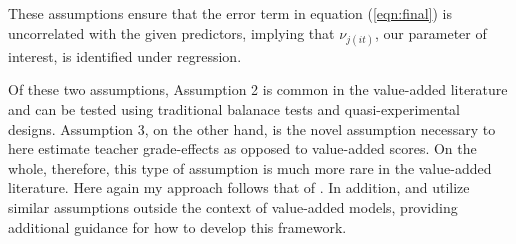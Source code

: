 \documentclass[../thesis_main.tex]{subfiles}
\begin{document}
\bigskip
\noindent{}
\bigskip

\bigskip
\noindent{}
\bigskip

\noindent These assumptions ensure that the error term in equation (\ref{eqn:final}) is uncorrelated with the given predictors, implying that $\nu_{j(it)}$, our parameter of interest, is identified under regression.

Of these two assumptions, Assumption 2 is common in the value-added literature and can be tested using traditional balanace tests and quasi-experimental designs. Assumption 3, on the other hand, is the novel assumption necessary to here estimate teacher grade-effects as opposed to value-added scores. On the whole, therefore, this type of assumption is much more rare in the value-added literature. Here again my approach follows that of \citet{gilraineMakingTeachingLast2020}. In addition, \citet{abdulkadirogluChartersLotteriesTesting2016} and \citet{kolesarIdentificationInferenceMany2015} utilize similar assumptions outside the context of value-added models, providing additional guidance for how to develop this framework. 




\end{document}
